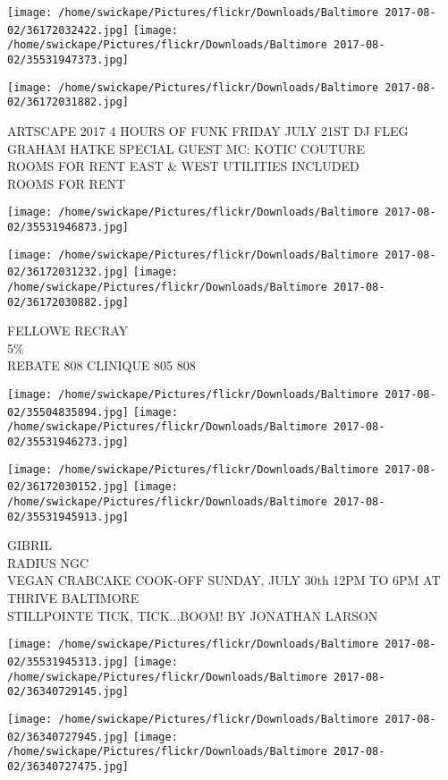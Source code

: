 \documentclass[10pt,letterpaper]{article}
\begin{document}
\texttt{[image: /home/swickape/Pictures/flickr/Downloads/Baltimore 2017-08-02/36172032422.jpg]}
\texttt{[image: /home/swickape/Pictures/flickr/Downloads/Baltimore 2017-08-02/35531947373.jpg]}

\texttt{[image: /home/swickape/Pictures/flickr/Downloads/Baltimore 2017-08-02/36172031882.jpg]}

ARTSCAPE 2017 4 HOURS OF FUNK FRIDAY JULY 21ST DJ FLEG GRAHAM HATKE SPECIAL GUEST MC: KOTIC COUTURE\\
ROOMS FOR RENT EAST \& WEST UTILITIES INCLUDED\\
ROOMS FOR RENT
\pagebreak

\texttt{[image: /home/swickape/Pictures/flickr/Downloads/Baltimore 2017-08-02/35531946873.jpg]}

\vspace{0.25in}
\texttt{[image: /home/swickape/Pictures/flickr/Downloads/Baltimore 2017-08-02/36172031232.jpg]}
\texttt{[image: /home/swickape/Pictures/flickr/Downloads/Baltimore 2017-08-02/36172030882.jpg]}

FELLOWE RECRAY\\
5\%\\
REBATE 808 CLINIQUE 805 808
\pagebreak

\texttt{[image: /home/swickape/Pictures/flickr/Downloads/Baltimore 2017-08-02/35504835894.jpg]}
\texttt{[image: /home/swickape/Pictures/flickr/Downloads/Baltimore 2017-08-02/35531946273.jpg]}

\texttt{[image: /home/swickape/Pictures/flickr/Downloads/Baltimore 2017-08-02/36172030152.jpg]}
\texttt{[image: /home/swickape/Pictures/flickr/Downloads/Baltimore 2017-08-02/35531945913.jpg]}

GIBRIL\\
RADIUS NGC\\
VEGAN CRABCAKE COOK{-}OFF SUNDAY, JULY 30th 12PM TO 6PM AT THRIVE BALTIMORE\\
STILLPOINTE TICK, TICK...BOOM!  BY JONATHAN LARSON
\pagebreak

\texttt{[image: /home/swickape/Pictures/flickr/Downloads/Baltimore 2017-08-02/35531945313.jpg]}
\texttt{[image: /home/swickape/Pictures/flickr/Downloads/Baltimore 2017-08-02/36340729145.jpg]}

\texttt{[image: /home/swickape/Pictures/flickr/Downloads/Baltimore 2017-08-02/36340727945.jpg]}
\texttt{[image: /home/swickape/Pictures/flickr/Downloads/Baltimore 2017-08-02/36340727475.jpg]}
\end{document}
